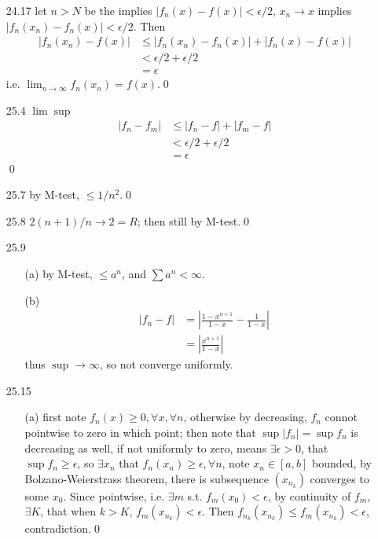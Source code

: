 \documentclass[paper=a4, fontsize=11pt]{scrartcl} %
\numberwithin{equation}{section} %
\numberwithin{figure}{section} %
\numberwithin{table}{section} %
\begin{document}
\begin{itemize}
\begin{equation}
\begin{split}
	&< \epsilon/3 + \epsilon/3 + \epsilon/3 \\
	&= \epsilon
	\end{split}
	\end{equation}
	i.e. $f$ is uniformly continuous.\qed
\item[24.17] let $n>N$ be the implies $|f_n(x)-f(x)|<\epsilon/2$, $x_n\rightarrow x$ implies $|f_n(x_n)-f_n(x)|<\epsilon/2$. Then
\begin{equation}\begin{split}
	|f_n(x_n) - f(x)| &\leq |f_n(x_n)-f_n(x)| + |f_n(x)-f(x)| \\
	 &< \epsilon/2 + \epsilon/2 \\
	 &= \epsilon
\end{split}
	\end{equation}
i.e. $\lim_{n\rightarrow\infty} f_n(x_n) = f(x)$.\qed
\item[25.4] $\lim\sup$
\begin{equation}\begin{split}
	|f_n - f_m| &\leq |f_n -f| + |f_m -f| \\
	&< \epsilon/2 + \epsilon/2 \\
	&= \epsilon
\end{split}
	\end{equation}\qed
\item[25.7] by M-test, $\leq 1/n^2$.\qed
\item[25.8] $2(n+1)/n \rightarrow 2=R$; then still by M-test.\qed
\item[25.9] \begin{itemize}
	\item[(a)] by M-test, $\leq a^n$, and $\sum a^n<\infty$.
	\item[(b)] \begin{equation}\begin{split}
		|f_n - f | &= |\frac{1-x^{n+1}}{1-x} - \frac{1}{1-x}| \\
			& = |\frac{x^{n+1}}{1-x}|
	\end{split}
	\end{equation}
	thus $\sup\rightarrow \infty$, so not converge uniformly.
	\end{itemize}
\item[25.15]\begin{itemize}
	\item[(a)] first note $f_n(x)\geq 0, \forall x,\forall n$, otherwise by decreasing, $f_n$ connot pointwise to zero in which point; then note that $\sup|f_n| = \sup f_n$ is decreasing as well, if not uniformly to zero, means $\exists \epsilon>0$, that $\sup f_n\geq \epsilon$, so $\exists x_n$ that $f_n(x_n)\geq \epsilon, \forall n$, note $x_n\in[a,b]$ bounded, by Bolzano-Weierstrass theorem, there is subsequence $(x_{n_k})$ converges to some $x_0$. Since pointwise, i.e. $\exists m$ s.t. $f_m(x_0)<\epsilon$, by continuity of $f_m$, $\exists K$, that when $k>K$, $f_m(x_{n_k})<\epsilon$. Then $f_{n_k}(x_{n_k}) \leq f_m(x_{n_k})<\epsilon$, contradiction.\qed 

\end{itemize}
\end{itemize}
\end{document}
